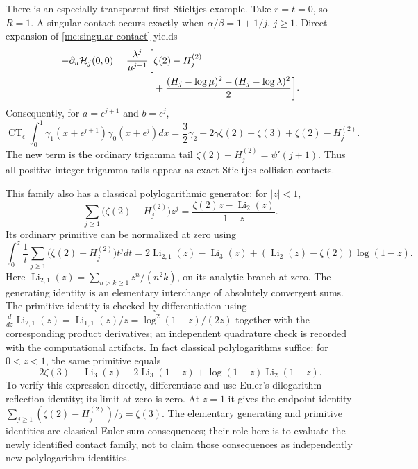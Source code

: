 \documentclass[11pt,a4paper]{article}
\numberwithin{equation}{section}
\theoremstyle{definition}
\theoremstyle{remark}
\begin{document}
There is an especially transparent first-Stieltjes example. Take
$r=t=0$, so $R=1$. A singular contact occurs exactly when
$\alpha/\beta=1+1/j$, $j\ge1$. Direct expansion of
\eqref{mc:singular-contact} yields
\begin{align}\label{mc:H10}
 -\partial_u\mathcal H_j(0,0)
 =\frac{\lambda^j}{\mu^{j+1}}\bigg[&\zeta(2)-H_j^{(2)}\notag\\
 &+\frac{(H_j-\log\mu)^2-(H_j-\log\lambda)^2}{2}\bigg].
\end{align}
Consequently, for $a=\epsilon^{j+1}$ and $b=\epsilon^j$,
\begin{equation}\label{mc:stieltjes-tail-contact}
 \boxed{\displaystyle
 \operatorname{CT}_{\epsilon}\int_0^1
          \gamma_1(x+\epsilon^{j+1})\gamma_0(x+\epsilon^j)dx
   =\frac32\gamma_2+2\gamma\zeta(2)-\zeta(3)
                         +\zeta(2)-H_j^{(2)}.}
\end{equation}
The new term is the ordinary trigamma tail
$\zeta(2)-H_j^{(2)}=\psi'(j+1)$.
Thus all positive integer trigamma tails appear as exact
Stieltjes collision contacts.

This family also has a classical polylogarithmic generator:
for $|z|<1$,
\begin{equation}\label{mc:polylog-generator}
 \sum_{j\ge1}\bigl(\zeta(2)-H_j^{(2)}\bigr)z^j
       =\frac{\zeta(2)z-\operatorname{Li}_2(z)}{1-z}.
\end{equation}
Its ordinary primitive can be normalized at zero using
\begin{equation}\label{mc:polylog-primitive}
 \int_0^z\frac1t
       \sum_{j\ge1}\bigl(\zeta(2)-H_j^{(2)}\bigr)t^jdt
   =2\operatorname{Li}_{2,1}(z)-\operatorname{Li}_3(z)
      +(\operatorname{Li}_2(z)-\zeta(2))\log(1-z).
\end{equation}
Here $\operatorname{Li}_{2,1}(z)=
\sum_{n>k\ge1}z^n/(n^2k)$, on its analytic branch at zero.
The generating identity is an elementary interchange of absolutely
convergent sums. The primitive identity is checked by differentiation
using $\frac{d}{dz}\operatorname{Li}_{2,1}(z)
=\operatorname{Li}_{1,1}(z)/z=\log^2(1-z)/(2z)$ together with
the corresponding product derivatives; an independent quadrature check
is recorded with the computational artifacts. In fact classical
polylogarithms suffice: for $0<z<1$, the same primitive equals
\begin{equation}\label{mc:classical-primitive}
 2\zeta(3)-\operatorname{Li}_3(z)-2\operatorname{Li}_3(1-z)
                +\log(1-z)\operatorname{Li}_2(1-z).
\end{equation}
To verify this expression directly, differentiate and use Euler's
dilogarithm reflection identity; its limit at zero is zero. At
$z=1$ it gives the endpoint identity
$\sum_{j\ge1}(\zeta(2)-H_j^{(2)})/j=\zeta(3)$.
The elementary generating and primitive identities are classical
Euler-sum consequences; their role here is to evaluate the newly
identified contact family, not to claim those consequences as
independently new polylogarithm identities.
\end{document}
